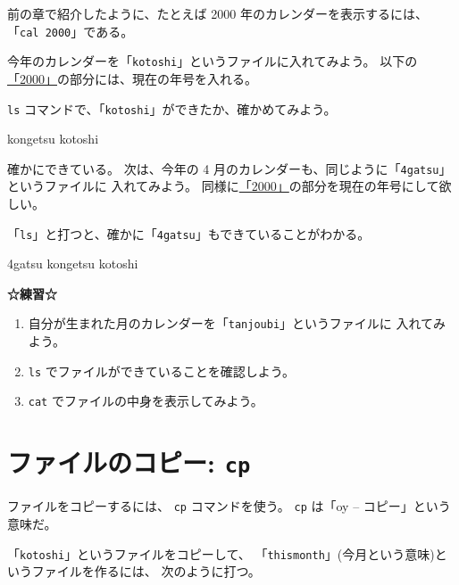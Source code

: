 前の章で紹介したように、たとえば 2000 年のカレンダーを表示するには、
「\texttt{cal 2000}」である。

今年のカレンダーを「\texttt{kotoshi}」というファイルに入れてみよう。
以下の \underline{「2000」}の部分には、現在の年号を入れる。

\begin{progls}
%
\end{progls}

 \texttt{ls} コマンドで、「\texttt{kotoshi}」ができたか、確かめてみよう。

\begin{progls}
kongetsu        kotoshi
%
\end{progls}

確かにできている。
次は、今年の 4 月のカレンダーも、同じように「\texttt{4gatsu}」というファイルに
入れてみよう。
同様に\underline{「2000」}の部分を現在の年号にして欲しい。

\begin{progls}
%
\end{progls}

「\texttt{ls}」と打つと、確かに「\texttt{4gatsu}」もできていることがわかる。

\begin{progls}
4gatsu          kongetsu        kotoshi
%
\end{progls}

\begin{BOXNOTE}
{\large\bf ☆練習☆}
\begin{enumerate}
\item 自分が生まれた月のカレンダーを「\texttt{tanjoubi}」というファイルに
入れてみよう。
\item \texttt{ls} でファイルができていることを確認しよう。
\item \texttt{cat} でファイルの中身を表示してみよう。
\end{enumerate}
\end{BOXNOTE}

\newpage

\section{ファイルのコピー: \texttt{cp}}

ファイルをコピーするには、 \texttt{cp} コマンドを使う。
 \texttt{cp} は「oy -- コピー」という意味だ。

「\texttt{kotoshi}」というファイルをコピーして、
「\texttt{thismonth}」(今月という意味)というファイルを作るには、
次のように打つ。


